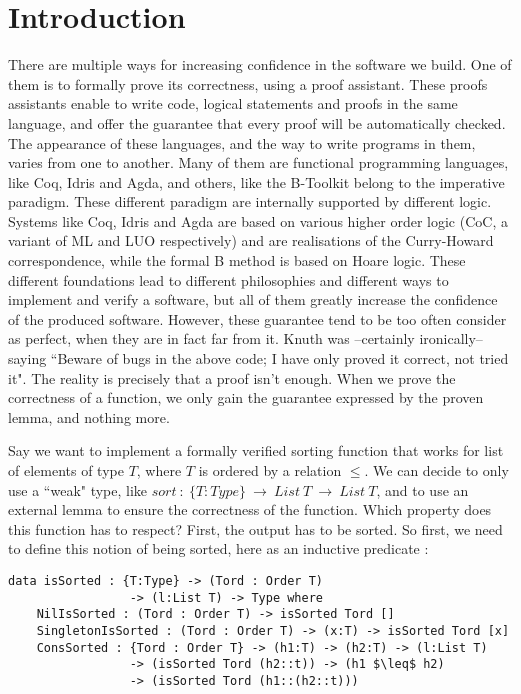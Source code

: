 \section{Introduction}


There are multiple ways for increasing confidence in the software we build. One of them is to formally prove its correctness, using a proof assistant. These proofs assistants enable to write code, logical statements and proofs in the same language, and offer the guarantee that every proof will be automatically checked. The appearance of these languages, and the way to write programs in them, varies from one to another. Many of them are functional programming languages, like Coq, Idris and Agda, and others, like the B-Toolkit belong to the imperative paradigm. These different paradigm are internally supported by different logic. Systems like Coq, Idris and Agda are based on various higher order logic (CoC, a variant of ML and LUO respectively) and are realisations of the Curry-Howard correspondence, while the formal B method is based on Hoare logic. These different foundations lead to different philosophies and different ways to implement and verify a software, but all of them greatly increase the confidence of the produced software. However, these guarantee tend to be too often consider as perfect, when they are in fact far from it. Knuth was --certainly ironically-- saying ``Beware of bugs in the above code; I have only proved it correct, not tried it". The reality is precisely that a proof isn't enough. When we prove the correctness of a function, we only gain the guarantee expressed by the proven lemma, and nothing more. 

Say we want to implement a formally verified sorting function that works for list of elements of type $T$, where $T$ is ordered by a relation $\leq$.
We can decide to only use a ``weak" type, like $sort\ :\ \{T:Type\}\ \rightarrow\ List\ T\ \rightarrow\ List\ T$, and to use an external lemma to ensure the correctness of the function. Which property does this function has to respect? First, the output has to be sorted. So first, we need to define this notion of being sorted, here as an inductive predicate :

\begin{lstlisting}
data isSorted : {T:Type} -> (Tord : Order T) 
                 -> (l:List T) -> Type where
    NilIsSorted : (Tord : Order T) -> isSorted Tord []
    SingletonIsSorted : (Tord : Order T) -> (x:T) -> isSorted Tord [x]
    ConsSorted : {Tord : Order T} -> (h1:T) -> (h2:T) -> (l:List T) 
                 -> (isSorted Tord (h2::t)) -> (h1 $\leq$ h2) 
                 -> (isSorted Tord (h1::(h2::t)))
\end{lstlisting}

